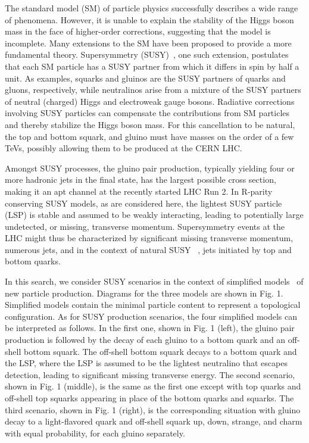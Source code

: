 The standard model (SM) of particle physics successfully describes a wide range of phenomena.
However, it is unable to explain the stability of the Higgs boson mass in the face of higher-order corrections, suggesting
that the model is incomplete. Many extensions to the SM have been proposed to provide a more
fundamental theory.  Supersymmetry (SUSY)~\cite{SUSYtheo}, one such extension, postulates that each
SM particle has a SUSY partner from which it differs in spin by half a unit.  As
examples, squarks and gluinos are the SUSY partners of quarks and gluons, respectively, while
neutralinos arise from a mixture of the SUSY partners of neutral (charged)
Higgs and electroweak gauge bosons. Radiative corrections involving SUSY particles can compensate the contributions from SM particles and thereby stabilize the Higgs boson mass.  For this cancellation to be natural, the top and bottom squark, and gluino must have
masses on the order of a few TeVs, possibly allowing them to be produced at the CERN
LHC.

Amongst SUSY processes,  the gluino pair production,  typically yielding four or more hadronic
jets in the final state, has the largest possible cross section, making it an apt channel at
 the recently started LHC Run 2. In R-parity ~\cite{RParity} conserving
SUSY models, as are considered here, the lightest SUSY particle (LSP) is stable and assumed
to be weakly interacting, leading to potentially large undetected, or missing, transverse momentum. Supersymmetry events at the LHC might thus be characterized by significant missing
transverse momentum, numerous jets, and in the context of natural SUSY ~\cite{Naturaln}, jets initiated
by top and bottom quarks.

In this search, we consider SUSY scenarios in the context of simplified models~\cite{SMS1} of new particle
production. Diagrams for the three models are shown in Fig. 1. Simplified models contain
the minimal particle content to represent a topological configuration. As for SUSY production
scenarios, the four simplified models can be interpreted as follows. In the first one, shown
in Fig. 1 (left), the gluino pair production is followed by the decay of each gluino to a bottom
quark and an off-shell bottom squark. The off-shell bottom squark decays to a bottom quark
and the LSP, where the LSP is assumed to be the lightest neutralino 
that escapes detection, leading to significant missing transverse energy. The second scenario, shown in Fig. 1 (middle), is the same as the first one except with top quarks and off-shell top squarks appearing in place of the bottom
quarks and squarks. The third scenario, shown in Fig. 1 (right), is the corresponding
situation with gluino decay to a light-flavored quark and off-shell squark up, down, strange,
and charm with equal probability, for each gluino separately. 

